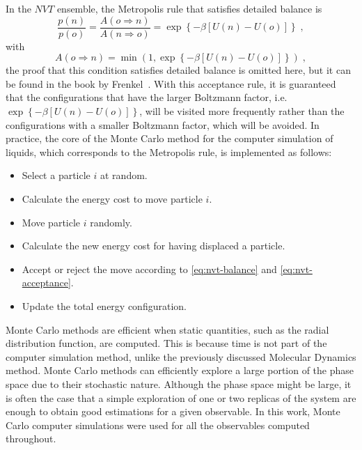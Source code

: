 In the $NVT$ ensemble, the Metropolis rule that satisfies detailed balance is
\begin{equation}
    \frac{p(n)}{p(o)} = \frac{A(o \Longrightarrow n)}{A(n \Longrightarrow o)} =
    \exp{ \left\{ -\beta \left[U(n) - U(o)\right] \right\} }
    \; ,
    \label{eq:nvt-balance}
\end{equation}
with
\begin{equation}
    A(o \Longrightarrow n) = \min{ \left(1, \exp{ \left\{ -\beta \left[U(n) - U(o)\right] \right\} } \right)} 
    \; ,
    \label{eq:nvt-acceptance}
\end{equation}
the proof that this condition satisfies detailed balance is omitted here, but it can
be found in the book by Frenkel~\cite{frenkelUnderstandingMolecularSimulation2001}.
With this acceptance rule, it is guaranteed that the configurations that have the larger
Boltzmann factor, i.e. $\exp{ \left\{ -\beta \left[U(n) - U(o)\right] \right\} }$, 
will be visited more frequently rather than the configurations with a smaller
Boltzmann factor, which will be avoided.
In practice, the core of the Monte Carlo method for the computer simulation of liquids, 
which corresponds to the Metropolis rule, is implemented as follows:
\begin{itemize}
    \item Select a particle $i$ at random.
    \item Calculate the energy cost to move particle $i$.
    \item Move particle $i$ randomly.
    \item Calculate the new energy cost for having displaced a particle.
    \item Accept or reject the move according to \autoref{eq:nvt-balance} and \autoref{eq:nvt-acceptance}.
    \item Update the total energy configuration.
\end{itemize}
Monte Carlo methods are efficient when static quantities, such as the radial distribution
function, are computed. This is because time is not part of the computer simulation method,
unlike the previously discussed Molecular Dynamics method.
Monte Carlo methods can efficiently explore a large portion of the phase
space due to their stochastic nature. Although the phase space might be large, it is often
the case that a simple exploration of one or two replicas of the system are enough
to obtain good estimations for a given observable. In this work, Monte Carlo computer 
simulations were used for all the observables computed throughout.

